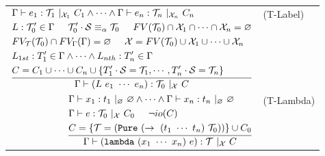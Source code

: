 \documentclass{article}
\begin{document}
\begin{figure}[tb]
\begin{tabular}{rlrl}
        \multicolumn{3}{r}{
        $\dfrac{
            \begin{aligned}
                &\Gamma \vdash e_1 : \mathcal{T}_1\ |_{\mathcal{X}_1}\ C_1 \land \cdots \land
                    \Gamma \vdash e_n : \mathcal{T}_n\ |_{\mathcal{X}_n}\ C_n \\
                &L : \mathcal{T}_0' \in \Gamma \hspace{5mm} \mathcal{T}_0' \cdot \mathcal{S}\equiv_\alpha \mathcal{T}_0 \hspace{5mm} FV(\mathcal{T}_0) \cap \mathcal{X}_1 \cap \cdots \cap \mathcal{X}_n = \varnothing \\
                &FV_\mathcal{T}(\mathcal{T}_0) \cap FV_\Gamma(\Gamma) = \varnothing \hspace{5mm}
                    \mathcal{X} = FV(\mathcal{T}_0) \cup \mathcal{X}_1 \cup \cdots \cup \mathcal{X}_n \\
                &L_{1st} : T_1' \in \Gamma \land \cdots \land L_{nth} : T_n' \in \Gamma \\
                &C = C_1 \cup \cdots \cup C_n \cup \{T_1' \cdot \mathcal{S} = \mathcal{T}_1, \cdots, T_n' \cdot \mathcal{S} = \mathcal{T}_n\} \\
            \end{aligned}
        }{
            \Gamma \vdash (L\ e_1\ \cdots\ e_n) : \mathcal{T}_0\ |_{\mathcal{X}}\ C
        }$} & (T-Label) \vspace{5mm} \\

        \multicolumn{3}{r}{
            $\dfrac{
                \begin{aligned}
                    &\Gamma \vdash x_1 : t_1\ |_\varnothing\ \varnothing \land \cdots \land \Gamma \vdash x_n : t_n\ |_\varnothing\ \varnothing \\
                    &\Gamma \vdash e : \mathcal{T}_0\ |_{\mathcal{X}}\ C_0 \hspace{5mm} \neg io(C)\\
                    &C = \{\mathcal{T} = (\mathtt{Pure}\ (\rightarrow\ (t_1\ \cdots\ t_n)\ \mathcal{T}_0))\} \cup C_0
                \end{aligned}
            }
            {
                \Gamma \vdash (\mathtt{lambda}\ (x_1\ \cdots\ x_n)\ e) : \mathcal{T}\ |_\mathcal{X}\ C
            }$
        } & (T-Lambda) \vspace{5mm} \\


\end{tabular}
\end{figure}
\end{document}
